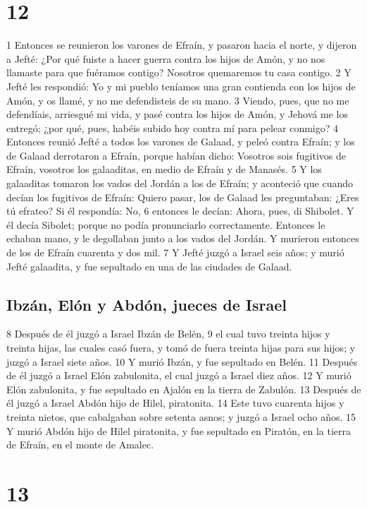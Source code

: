\chapter{12}

1 Entonces se reunieron los varones de Efraín, y pasaron hacia el norte, y dijeron a Jefté: ¿Por qué fuiste a hacer guerra contra los hijos de Amón, y no nos llamaste para que fuéramos contigo? Nosotros quemaremos tu casa contigo.
2 Y Jefté les respondió: Yo y mi pueblo teníamos una gran contienda con los hijos de Amón, y os llamé, y no me defendisteis de su mano.
3 Viendo, pues, que no me defendíais, arriesgué mi vida, y pasé contra los hijos de Amón, y Jehová me los entregó; ¿por qué, pues, habéis subido hoy contra mí para pelear conmigo?
4 Entonces reunió Jefté a todos los varones de Galaad, y peleó contra Efraín; y los de Galaad derrotaron a Efraín, porque habían dicho: Vosotros sois fugitivos de Efraín, vosotros los galaaditas, en medio de Efraín y de Manasés.
5 Y los galaaditas tomaron los vados del Jordán a los de Efraín; y aconteció que cuando decían los fugitivos de Efraín: Quiero pasar, los de Galaad les preguntaban: ¿Eres tú efrateo? Si él respondía: No,
6 entonces le decían: Ahora, pues, di Shibolet. Y él decía Sibolet; porque no podía pronunciarlo correctamente. Entonces le echaban mano, y le degollaban junto a los vados del Jordán. Y murieron entonces de los de Efraín cuarenta y dos mil.
7 Y Jefté juzgó a Israel seis años; y murió Jefté galaadita, y fue sepultado en una de las ciudades de Galaad.

\section*{Ibzán, Elón y Abdón, jueces de Israel}

8 Después de él juzgó a Israel Ibzán de Belén,
9 el cual tuvo treinta hijos y treinta hijas, las cuales casó fuera, y tomó de fuera treinta hijas para sus hijos; y juzgó a Israel siete años.
10 Y murió Ibzán, y fue sepultado en Belén.
11 Después de él juzgó a Israel Elón zabulonita, el cual juzgó a Israel diez años.
12 Y murió Elón zabulonita, y fue sepultado en Ajalón en la tierra de Zabulón.
13 Después de él juzgó a Israel Abdón hijo de Hilel, piratonita.
14 Este tuvo cuarenta hijos y treinta nietos, que cabalgaban sobre setenta asnos; y juzgó a Israel ocho años.
15 Y murió Abdón hijo de Hilel piratonita, y fue sepultado en Piratón, en la tierra de Efraín, en el monte de Amalec.

\chapter{13}

